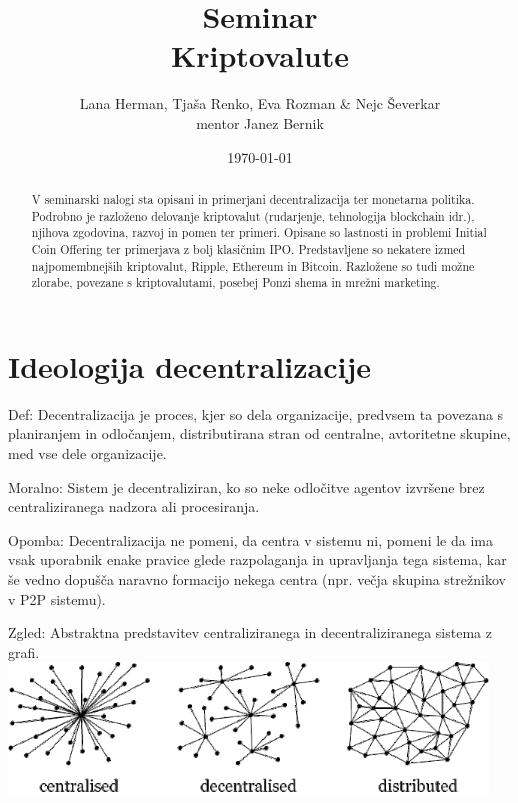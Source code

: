 \documentclass[letterpaper, titlepage, freqn]{article}
\begin{document}
\title{Seminar \\ Kriptovalute}
\author{Lana Herman, Tjaša Renko, Eva Rozman \& Nejc Ševerkar \\ mentor Janez Bernik}
\date{\today}
\maketitle

\begin{abstract}
\begin{center}
V seminarski nalogi sta opisani in primerjani decentralizacija ter monetarna politika. Podrobno je razloženo delovanje kriptovalut (rudarjenje, tehnologija blockchain idr.), njihova zgodovina, razvoj in pomen ter primeri. Opisane so lastnosti in problemi Initial Coin Offering ter primerjava z bolj klasičnim IPO. Predstavljene so nekatere izmed najpomembnejših kriptovalut, Ripple, Ethereum in Bitcoin. Razložene so tudi možne zlorabe, povezane s kriptovalutami, posebej Ponzi shema in mrežni marketing.
\end{center}
\end{abstract}

\tableofcontents


\clearpage

\section{Ideologija decentralizacije}

Def: Decentralizacija je proces, kjer so dela organizacije, predvsem ta povezana s planiranjem in odločanjem, distributirana stran od centralne, avtoritetne skupine, med vse dele organizacije.

Moralno: Sistem je decentraliziran, ko so neke odločitve agentov izvršene brez centraliziranega nadzora ali procesiranja.

Opomba: Decentralizacija ne pomeni, da centra v sistemu ni, pomeni le da ima vsak uporabnik enake pravice glede razpolaganja in upravljanja tega sistema, kar še vedno dopušča naravno formacijo nekega centra (npr. večja skupina strežnikov v P2P sistemu).

Zgled: Abstraktna predstavitev centraliziranega in decentraliziranega sistema z grafi.\\

\includegraphics[height=3.5cm]{ponazoritev_decentralizacije}\\
\end{document}
